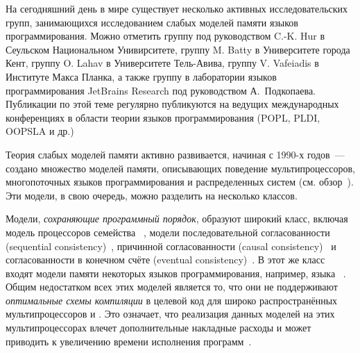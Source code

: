 {\progress}

На сегодняшний день в мире существует несколько активных исследовательских групп, 
занимающихся исследованием слабых моделей памяти языков программирования.
Можно отметить
группу под руководством C.-K. Hur в Сеульском Национальном Унивирситете,
группу M. Batty в Университете города Кент,
группу O. Lahav в Университете Тель-Авива,
группу V. Vafeiadis в Институте Макса Планка,
а также группу в лаборатории языков программирования JetBrains Research
под руководством А.~Подкопаева. 
Публикации по этой теме регулярно публикуются на ведущих
международных конференциях в области теории языков программирования 
(POPL, PLDI, OOPSLA и др.)

Теория слабых моделей памяти активно развивается, 
начиная с 1990-х годов~--- создано множество моделей памяти, 
описывающих поведение мультипроцессоров, 
многопоточных языков программирования и распределенных систем 
(см. обзор~\cite{Moiseenko-al:PCS21}). 
Эти модели, в свою очередь, можно разделить на несколько классов.

Модели, \emph{сохраняющие программный порядок}, образуют широкий класс,
включая модель \TSO процессоров семейства \Intel~\autocite{Sewell-al:CACM10},
модели последовательной согласованности (sequential consistency)~\autocite{Lamport:TC79},
причинной согласованности (causal consistency)~\autocite{Lahav-Boker:PLDI2020}
и согласованности в конечном счёте (eventual consistency)~\autocite{Jagadeesan-al:ESOP2018}. 
В этот же класс входят  модели памяти некоторых языков программирования, например,
языка \OCaml~\autocite{Dolan-al:PLDI18}.
Общим недостатком всех этих моделей является то,
что они не поддерживают \emph{оптимальные схемы компиляции} 
в целевой код для широко распространённых мультипроцессоров \ARM и \POWER.
Это означает, что реализация данных моделей на этих мультипроцессорах
влечет дополнительные накладные расходы и может приводить
к увеличению времени исполнения программ~\autocite{Ou-Demsky:OOPSLA18}. 

